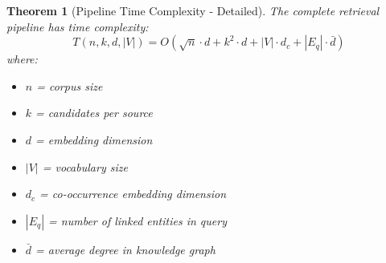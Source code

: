 \documentclass[11pt]{article}
\newtheorem{theorem}{Theorem}
\begin{document}
\begin{theorem}[Pipeline Time Complexity - Detailed]
\label{thm:time_full}
The complete retrieval pipeline has time complexity:
\begin{equation}
T(n, k, d, |V|) = O\left(\sqrt{n} \cdot d + k^2 \cdot d + |V| \cdot d_c + |E_q| \cdot \bar{d}\right)
\end{equation}
where:
\begin{itemize}
    \item $n$ = corpus size
    \item $k$ = candidates per source
    \item $d$ = embedding dimension
    \item $|V|$ = vocabulary size
    \item $d_c$ = co-occurrence embedding dimension
    \item $|E_q|$ = number of linked entities in query
    \item $\bar{d}$ = average degree in knowledge graph
\end{itemize}
\end{theorem}
\end{document}
